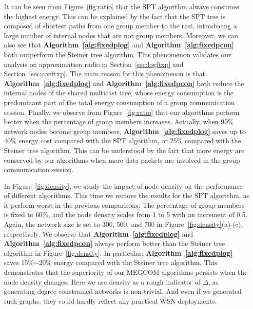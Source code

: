 \documentclass[10pt, conference, compsocconf]{IEEEtran}
\begin{document}
It can be seen from Figure~\ref{fig:ratio} that the SPT algorithm always consumes the highest energy. This can be explained by the fact that the SPT tree is composed of shortest paths from one group member to the rest, introducing a large number of internal nodes that are not group members. Moreover, we can also see that \textbf{Algorithm~\ref{alg:fixedplog}} and \textbf{Algorithm~\ref{alg:fixedpcon}} both outperform the Steiner tree algorithm. This phenomenon validates our analysis on approximation radio in Section~\ref{sec:logftxp} and Section~\ref{sec:conftxp}. The main reason for this phenomenon is that \textbf{Algorithm~\ref{alg:fixedplog}} and \textbf{Algorithm~\ref{alg:fixedpcon}} both reduce the internal nodes of the shared multicast tree, whose energy consumption is the predominant part of the total energy consumption of a group communication session. Finally, we observe from Figure~\ref{fig:ratio} that our algorithms perform better when the percentage of group members increases. Actually, when 90\% network nodes become group members, \textbf{Algorithm~\ref{alg:fixedplog}} saves up to 40\% energy cost compared with the SPT algorithm, or 25\% compared with the Steiner tree algorithm. This can be understood by the fact that more energy are conserved by our algorithms when more data packets are involved in the group communication session.

  In Figure~\ref{fig:density}, we study the impact of node density on the performance of different algorithms. This time we remove the results for the SPT algorithm, as it perform worst in the previous comparisons. The percentage of group members is fixed to 60\%, and the node density scales from 1 to 5 with an increment of 0.5. Again, the network size is set to 300, 500, and 700 in Figure~\ref{fig:density}(a)-(c), respectively. We observe that \textbf{Algorithm~\ref{alg:fixedplog}} and \textbf{Algorithm~\ref{alg:fixedpcon}} always perform better than the Steiner tree algorithm in Figure~\ref{fig:density}. In particular, \textbf{Algorithm~\ref{alg:fixedplog}} saves 15\%$\sim$20\% energy compared with the Steiner tree algorithm. This demonstrates that the superiority of our MEGCOM algorithms persists when the node density changes. Here we use density as a rough indicator of $\Delta$, as generating degree constrained networks is non-trivial. And even if we generated such graphs, they could hardly reflect any practical WSN deployments.
\end{document}
